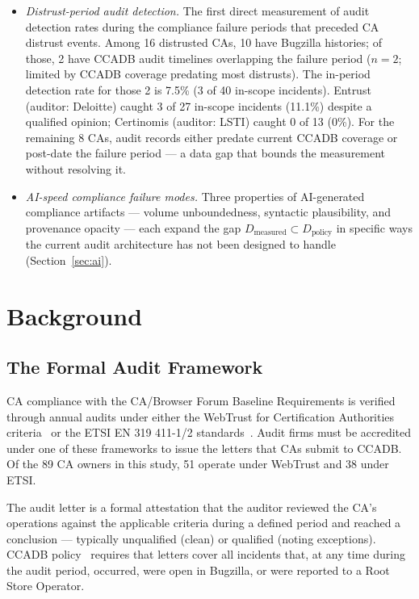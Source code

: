 \documentclass[10pt,twocolumn,letterpaper]{article}
\begin{document}
\begin{itemize}[noitemsep,topsep=2pt]
  detection quality more reliably than auditor size or resources.
\item \textit{Distrust-period audit detection.} The first direct
  measurement of audit detection rates during the compliance failure
  periods that preceded CA distrust events. Among 16 distrusted CAs,
  10 have Bugzilla histories; of those, 2 have CCADB audit timelines
  overlapping the failure period ($n=2$; limited by CCADB coverage
  predating most distrusts). The in-period detection rate for
  those 2 is 7.5\% (3 of 40 in-scope incidents). Entrust (auditor:
  Deloitte) caught 3 of 27 in-scope incidents (11.1\%) despite a
  qualified opinion; Certinomis (auditor: LSTI) caught 0 of 13 (0\%).
  For the remaining 8 CAs, audit records either predate current CCADB
  coverage or post-date the failure period --- a data gap that bounds
  the measurement without resolving it.
\item \textit{AI-speed compliance failure modes.} Three properties
  of AI-generated compliance artifacts --- volume unboundedness,
  syntactic plausibility, and provenance opacity --- each expand the
  gap $D_\text{measured} \subset D_\text{policy}$ in specific ways
  the current audit architecture has not been designed to handle
  (Section~\ref{sec:ai}).
\end{itemize}

\section{Background}
\label{sec:background}

\subsection{The Formal Audit Framework}
CA compliance with the CA/Browser Forum Baseline Requirements is verified
through annual audits under either the WebTrust for Certification
Authorities criteria~\cite{webtrust} or the ETSI EN 319 411-1/2
standards~\cite{etsi-en}. Audit firms must be accredited under one of
these frameworks to issue the letters that CAs submit to CCADB. Of the
89 CA owners in this study, 51 operate under WebTrust and 38 under ETSI.

The audit letter is a formal attestation that the auditor reviewed the
CA's operations against the applicable criteria during a defined period
and reached a conclusion --- typically unqualified (clean) or qualified
(noting exceptions). CCADB policy~\cite{ccadb-policy} requires that letters
cover all incidents that, at any time during the audit period, occurred,
were open in Bugzilla, or were reported to a Root Store Operator.
\end{document}

